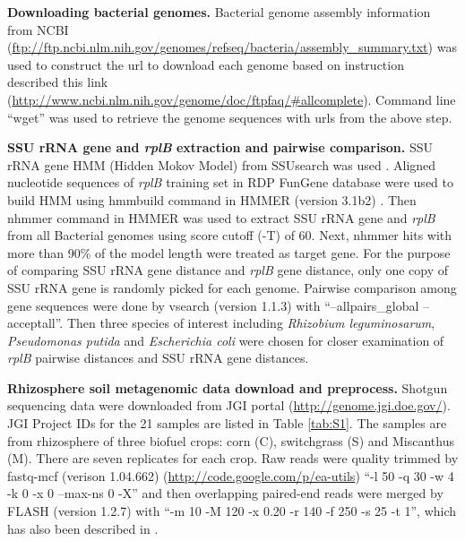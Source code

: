 \documentclass[]{msu-thesis}
\begin{document}
\textbf{Downloading bacterial genomes. }
Bacterial genome assembly information from NCBI 
(\url{ftp://ftp.ncbi.nlm.nih.gov/genomes/refseq/bacteria/assembly_summary.txt})
was used to construct the url to download each genome based on instruction described this link (\url{http://www.ncbi.nlm.nih.gov/genome/doc/ftpfaq/#allcomplete}). Command line ``wget'' was used to retrieve the genome sequences with urls from the above step.

\textbf{SSU rRNA gene and \textit{rplB} extraction and pairwise comparison. }
SSU rRNA gene HMM (Hidden Mokov Model) from SSUsearch was used \cite{guo_microbial_2015}. Aligned nucleotide sequences of \textit{rplB} training set in RDP FunGene database were used to build HMM using hmmbuild command in HMMER (version 3.1b2) \cite{eddy_new_2009}. Then nhmmer command in HMMER was used to extract SSU rRNA gene and \textit{rplB} from all Bacterial genomes using score cutoff (-T) of 60. Next, nhmmer hits with more than 90\% of the model length were treated as target gene. For the purpose of comparing SSU rRNA gene distance and \textit{rplB} gene distance, only one copy of SSU rRNA gene is randomly picked for each genome. Pairwise comparison among gene sequences were done by vsearch (version 1.1.3) with ``--allpairs\_global --acceptall''. Then three species of interest including \textit{\textit{Rhizobium} leguminosarum}, \textit{Pseudomonas putida} and \textit{Escherichia coli} were chosen for closer examination of \textit{rplB} pairwise distances and SSU rRNA gene distances.

\textbf{Rhizosphere soil metagenomic data download and preprocess. }
Shotgun sequencing data were downloaded from JGI portal (\url{http://genome.jgi.doe.gov/}). JGI Project IDs for the 21 samples are listed in Table \ref{tab:S1}. The samples are from rhizosphere of three biofuel crops: corn (C), switchgrass (S) and Miscanthus (M). There are seven replicates for each crop.
Raw reads were quality trimmed by fastq-mcf (verison 1.04.662) (\url{http://code.google.com/p/ea-utils}) ``-l 50 -q 30 -w 4 -k 0 -x 0 --max-ns 0 -X'' and then overlapping paired-end reads were merged by FLASH (version 1.2.7) \cite{magoc_flash:_2011} with ``-m 10 -M 120 -x 0.20 -r 140 -f 250 -s 25 -t 1'', which has also been described in \cite{guo_microbial_2015}. 
\end{document}
